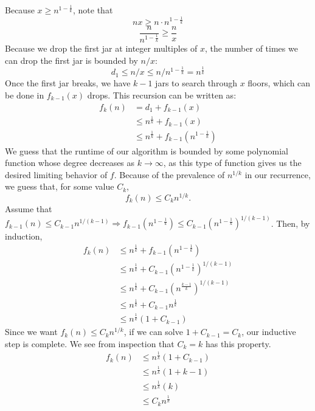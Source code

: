 \documentclass[12 pt, oneside]{article}
\begin{document}
\begin{enumerate}
\begin{enumerate}
Because $x \ge n^{1 - \frac{1}{k}}$, note that 
$$ nx \ge n \cdot n^{1 - \frac{1}{k}}$$
$$ \frac{n}{n^{1 - \frac{1}{k}}} \ge \frac{n}{x} $$
Because we drop the first jar at integer multiples of $x$, the number of times we can drop the first jar is bounded by $n/x$: 
$$d_1 \le n/x \le n/n^{1 - \frac{1}{k}} = n^{\frac{1}{k}}$$
Once the first jar breaks, we have $k-1$ jars to search through $x$ floors, which can be done in $f_{k-1}(x)$ drops. This recursion can be written as:
\begin{equation*}
\begin{split}
f_k(n) & = d_1+ f_{k-1}(x) \\
& \le n^{\frac{1}{k}} + f_{k-1}(x) \\
	& \le  n^{\frac{1}{k}} + f_{k-1}(n^{1 - \frac{1}{k}})
\end{split}
\end{equation*}
We guess that the runtime of our algorithm is bounded by some polynomial function whose degree decreases as $k \rightarrow \infty $, as this type of function gives us the desired limiting behavior of $f$. Because of the prevalence of $n^{1/k}$ in our recurrence, we guess that, for some value $C_k$,
$$ f_k(n) \le C_k n^{1/k}. $$
Assume that $f_{k-1}(n) \le C_{k-1}n^{1/(k-1)} \Rightarrow f_{k-1}(n^{1 - \frac{1}{k}}) \le C_{k-1}(n^{1 - \frac{1}{k}})^{1/(k-1)}$. Then, by induction,
\begin{equation*}
\begin{split}
f_k(n) & \le n^{\frac{1}{k}} + f_{k-1}(n^{1 - \frac{1}{k}})\\
& \le n^{\frac{1}{k}} + C_{k-1}(n^{1 - \frac{1}{k}})^{1/(k-1)}\\
& \le n^{\frac{1}{k}} + C_{k-1}(n^{\frac{k-1}{k}})^{1/(k-1)}\\
& \le n^{\frac{1}{k}} + C_{k-1}n^{\frac{1}{k}}\\
& \le n^{\frac{1}{k}}(1 + C_{k-1})
\end{split}
\end{equation*}
Since we want $ f_k(n) \le C_k n^{1/k} $, if we can solve $1 + C_{k-1} = C_k$, our inductive step is complete. We see from inspection that $C_k = k$ has this property.
\begin{equation*}
\begin{split}
f_k(n) & \le n^{\frac{1}{k}}(1 + C_{k-1})\\
 & \le n^{\frac{1}{k}}(1 + k-1)\\
& \le n^{\frac{1}{k}}(k)\\
& \le C_kn^{\frac{1}{k}}
\end{split}

\end{equation*}
\end{enumerate}
\end{enumerate}
\end{document}
